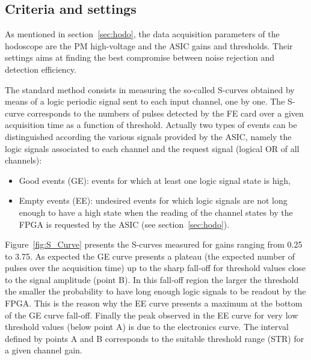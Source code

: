 \documentclass[a4paper,11pt]{article}
\begin{document}
\subsection{Criteria and settings}
\label{Settings}

As mentioned in section~\ref{sec:hodo}, the data acquisition parameters of the hodoscope are the PM high-voltage and the ASIC gains and thresholds. Their settings aims at finding the best compromise between noise rejection and detection efficiency.

The standard method consists in measuring the so-called S-curves obtained by means of a logic periodic signal sent to each input channel, one by one. The S-curve corresponds to the numbers of pulses detected by the FE card over a given acquisition time as a function of threshold. Actually two types of events can be distinguished according the various signals provided by the ASIC, namely the logic signals associated to each channel and the request signal (logical OR of all channels):
\begin{itemize}
  \item Good events (GE): events for which at least one logic signal state is high, 
  \item Empty events (EE): undesired events for which logic signals are not long enough to have a high state when the reading of the channel states by the FPGA is requested by the ASIC (see section~\ref{sec:hodo}).
\end{itemize}

Figure~\ref{fig:S_Curve} presents the S-curves measured for gains ranging from 0.25 to 3.75. As expected the GE curve presents a plateau (the expected number of pulses over the acquisition time) up to the sharp fall-off for threshold values close to the signal amplitude (point B). In this fall-off region the larger the threshold the smaller the probability to have long enough logic signals to be readout by the FPGA. This is the reason why the EE curve presents a maximum at the bottom of the GE curve fall-off. Finally the peak observed in the EE curve for very low threshold values (below point A) is due to the electronics curve. The interval defined by points A and B corresponds to the suitable threshold range (STR) for a given channel gain.
\end{document}
